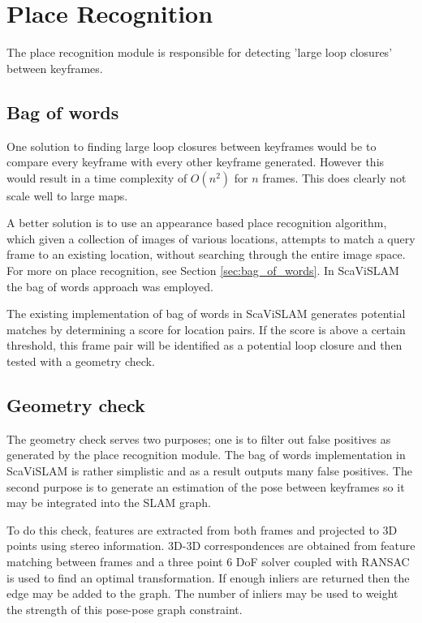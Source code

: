 \section{Place Recognition}
\label{sec:scavislam_place_recog}

The place recognition module is responsible for detecting 'large loop closures' between keyframes.

\subsection{Bag of words}

One solution to finding large loop closures between keyframes would be to compare every keyframe with every other keyframe generated.  However this would result in a time complexity of $O(n^2)$ for $n$ frames.  This does clearly not scale well to large maps.

A better solution is to use an appearance based place recognition algorithm, which given a collection of images of various locations, attempts to match a query frame to an existing location, without searching through the entire image space.  For more on place recognition, see Section \ref{sec:bag_of_words}.  In ScaViSLAM the bag of words approach was employed.

The existing implementation of bag of words in ScaViSLAM generates potential matches by determining a score for location pairs.  If the score is above a certain threshold, this frame pair will be identified as a potential loop closure and then tested with a geometry check.

\subsection{Geometry check}
\label{subsec:geometry_check}

The geometry check serves two purposes; one is to filter out false positives as generated by the place recognition module.  The bag of words implementation in ScaViSLAM is rather simplistic and as a result outputs many false positives.  The second purpose is to generate an estimation of the pose between keyframes so it may be integrated into the SLAM graph.  

To do this check, features are extracted from both frames and projected to 3D points using stereo information.  3D-3D correspondences are obtained from feature matching between frames and a three point 6 DoF solver\cite{umeyama} coupled with RANSAC is used to find an optimal transformation.  If enough inliers are returned then the edge may be added to the graph.  The number of inliers may be used to weight the strength of this pose-pose graph constraint.

